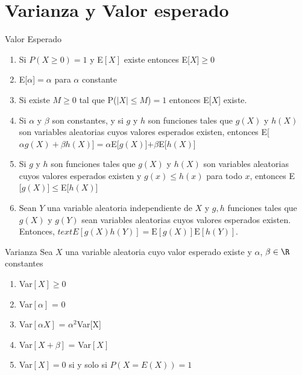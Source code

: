 \documentclass{beamer}
\begin{document}
  \section{Varianza y Valor esperado}
  \begin{frame}{Valor Esperado}
    \begin{enumerate}
      \item Si $P(X \geq 0) = 1$ y E$[X]$ existe entonces E[$X$]$\geq 0$
      \item E[$\alpha$]$= \alpha$ para $\alpha$ constante
      \item Si existe $M \geq 0$ tal que P($|X| \leq M$)$=1$ entonces E[$X$] existe. 
      \item Si $\alpha$ y $\beta$ son constantes, y si $g$ y $h$ son funciones tales que 
            $g(X)$ y $h(X)$ son variables aleatorias cuyos valores esperados existen, 
            entonces E[$\alpha g(X) + \beta h(X)$]$= \alpha$E[$g(X)$]$+ \beta$E[$h(X)$]
      \item Si $g$ y $h$ son funciones tales que $g(X)$ y $h(X)$ son variables aleatorias
            cuyos valores esperados existen y $g(x)\leq h(x)$ para todo $x$, entonces 
            E$[g(X)$]$\leq$E[$h(X)$]
      \item Sean $Y$ una variable aleatoria independiente de $X$ y $g,h$ funciones
      tales que $g(X)$ y $g(Y)$ sean variables aleatorias cuyos valores esperados
      existen. Entonces, $text{E}[g(X)h(Y)]=\text{E}[g(X)]\text{E}[h(Y)]$.
  \end{enumerate}
  \end{frame}
  \begin{frame}{Varianza}
    Sea $X$ una variable aleatoria cuyo valor esperado existe y 
    $\alpha$, $\beta \in \R$ constantes
    \begin{enumerate}
      \item Var$[X] \geq 0$ 
      \item Var$[\alpha]$ = 0
      \item Var$[\alpha X]$ = $\alpha^2$Var[X]
      \item Var$[X + \beta]$ = Var$[X]$
      \item Var$[X] = 0$ si y solo si $P(X=E(X))=1$ 
  \end{enumerate}
  \end{frame}
\end{document}
